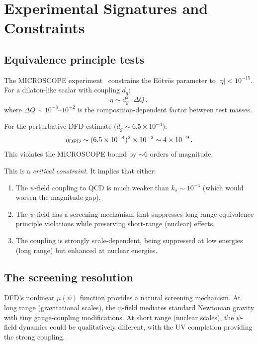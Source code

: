 \documentclass[aps,prd,twocolumn,superscriptaddress,floatfix,nofootinbib]{revtex4-2}
\newcommand{\mufunction}{\mu}
\begin{document}
\section{Experimental Signatures and Constraints}
\label{sec:experiment}

\subsection{Equivalence principle tests}

The MICROSCOPE experiment~\cite{MICROSCOPE2017} constrains the E\"{o}tv\"{o}s
parameter to $|\eta| < 10^{-15}$. For a dilaton-like scalar with coupling
$d_g$:
\begin{equation}
\eta \sim d_g^2 \cdot \Delta Q \, ,
\end{equation}
where $\Delta Q \sim 10^{-3}$--$10^{-2}$ is the composition-dependent factor
between test masses.

For the perturbative DFD estimate ($d_g \sim 6.5 \times 10^{-4}$):
\begin{equation}
\eta_{\rm DFD} \sim (6.5 \times 10^{-4})^2 \times 10^{-2} \sim 4 \times 10^{-9}
\, .
\end{equation}
This violates the MICROSCOPE bound by $\sim 6$ orders of magnitude.

This is a \emph{critical constraint}. It implies that either:
\begin{enumerate}
\item The $\psi$-field coupling to QCD is much weaker than $k_s \sim 10^{-4}$
(which would worsen the magnitude gap).
\item The $\psi$-field has a screening mechanism that suppresses long-range
equivalence principle violations while preserving short-range (nuclear) effects.
\item The coupling is strongly scale-dependent, being suppressed at low energies
(long range) but enhanced at nuclear energies.
\end{enumerate}

\subsection{The screening resolution}

DFD's nonlinear $\mufunction(\psi)$ function provides a natural screening
mechanism. At long range (gravitational scales), the $\psi$-field mediates
standard Newtonian gravity with tiny gauge-coupling modifications. At short
range (nuclear scales), the $\psi$-field dynamics could be qualitatively
different, with the UV completion providing the strong coupling.
\end{document}
